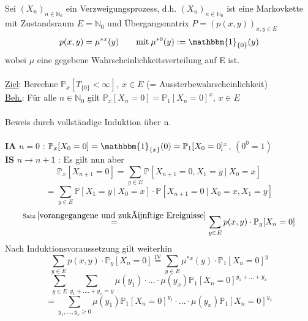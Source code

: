 Sei $(X_{n})_{n \in \mathbb{N}_{0}}$ ein Verzweigungsprozess, d.h. $(X_{n})_{n \in \mathbb{N}_{0}}$ ist eine Markovkette mit Zustandsraum $E = \mathbb{N}_{0}$ und Übergangsmatrix $P = (p(x,y))_{x,y \in E}$
\begin{equation*}
p(x,y) = \mu^{*x}(y) \qquad \mathrm{mit} \: \mu^{*0}(y) := \mathbbm{1}_{\lbrace 0 \rbrace}(y)
\end{equation*}
wobei $\mu$ eine gegebene Wahrscheinlichkeitsverteilung auf E ist.
\\
\\
\underline{Ziel}: Berechne $\mathbb{P}_{x}[T_{\lbrace 0 \rbrace} < \infty ], \: x \in E$ (= Aussterbewahrscheinlichkeit)
\\
\underline{Beh.}: Für alle $n \in \mathbb{N}_{0}$ gilt $\mathbb{P}_{x}[X_{n} = 0] = \mathbb{P}_{1}[X_{n} = 0]^{x}$, $x \in E$
\\
\\
Beweis durch vollständige Induktion über n.
\\
\\
\textbf{IA} $n=0$ : $\mathbb{P}_{x}[X_{0} = 0] = \mathbbm{1}_{\lbrace x \rbrace}(0) = \mathbb{P}_{1}[X_{0} = 0]^{x}$, $(0^{0} = 1)$
\\
\textbf{IS} $n \to n+1$ : Es gilt nun aber
\begin{equation*}
\mathbb{P}_{x}[X_{n+1} = 0] = \sum_{y \in E} \mathbb{P}[X_{n+1} = 0, X_{1} = y \: | \: X_{0} = x]
\end{equation*}
\begin{equation*}
=\sum_{y \in E} \mathbb{P}[X_{1} = y \: | \: X_{0} = x] \cdot \mathbb{P}[X_{n+1} = 0 \: | \: X_{0} = x, X_{1} = y ]
\end{equation*}
\begin{equation*}
\stackrel{\mathrm{Satz} \: \ref{vorangegangene und zukünftige Ereignisse}}{=}   \sum_{y \in E} p(x,y) \cdot \mathbb{P}_{y}[X_{n} = 0]
\end{equation*}
Nach Induktionsvoraussetzung gilt weiterhin
\begin{equation*}
\sum_{y \in E} p(x,y) \cdot \mathbb{P}_{y}[X_{n} = 0] \stackrel{\mathrm{IV}}{=}  \sum_{y \in E} \mu^{*x}(y) \cdot \mathbb{P}_{1}[X_{n} = 0]^{y}
\end{equation*}
\begin{equation*}
\sum_{y \in E} \sum_{y_{1} +....+ y_{x} = y} \mu(y_{1}) \cdot ... \cdot \mu(y_{x}) \mathbb{P}_{1}[X_{n} = 0]^{y_{1}+...+y_{x}}
\end{equation*}
\begin{equation*}
= \sum_{y_{1},...,y_{x} \geq 0 } \mu(y_{1}) \mathbb{P}_{1}[X_{n} = 0]^{y_{1}} \cdot...\cdot \mu(y_{x}) \mathbb{P}_{1}[X_{n} = 0]^{y_{x}}
\end{equation*}
